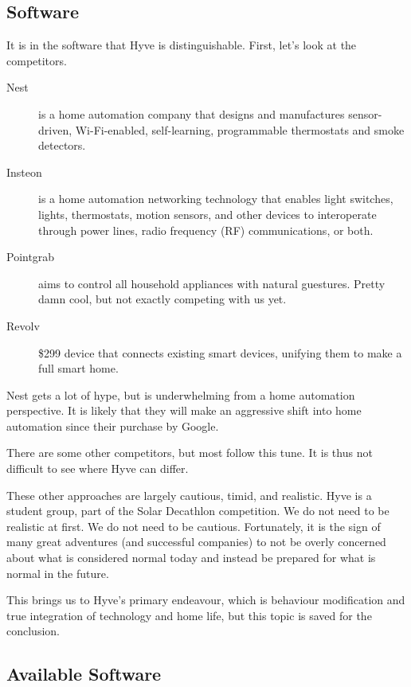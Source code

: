 \begin{multicols}{2}
	
	\subsection{Software}
	
		It is in the software that Hyve is distinguishable.
		First, let's look at the competitors.
		\begin{description}
			\item[Nest] is a home automation company that designs and manufactures sensor-driven, Wi-Fi-enabled, self-learning, programmable thermostats and smoke detectors.
			\item[Insteon] is a home automation networking technology that enables light switches, lights, thermostats, motion sensors, and other devices to interoperate through power lines, radio frequency (RF) communications, or both.
			\item[Pointgrab] aims to control all household appliances with natural guestures.  Pretty damn cool, but not exactly competing with us yet.
			\item[Revolv] \$299 device that connects existing smart devices, unifying them to make a full smart home.
		\end{description}
		
		Nest gets a lot of hype, but is underwhelming from a home automation perspective.
		It is likely that they will make an aggressive shift into home automation since their purchase by Google.
		
		There are some other competitors, but most follow this tune.
		It is thus not difficult to see where Hyve can differ.
		
		These other approaches are largely cautious, timid, and realistic.
		Hyve is a student group, part of the Solar Decathlon competition.
		We do not need to be realistic at first.
		We do not need to be cautious.
		Fortunately, it is the sign of many great adventures (and successful companies) to not be overly concerned about what is considered normal today and instead be prepared for what is normal in the future.
		
		This brings us to Hyve's primary endeavour, which is behaviour modification and true integration of technology and home life, but this topic is saved for the conclusion.
		
	\subsection{Available Software}
	

\end{multicols}

